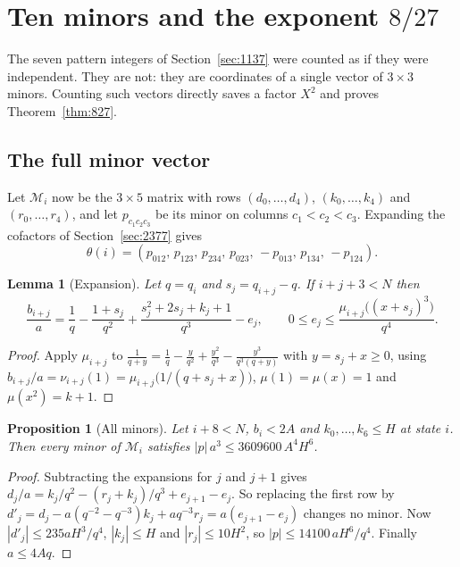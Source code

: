 \documentclass[11pt]{amsart}
\newtheorem{lemma}[theorem]{Lemma}
\newtheorem{proposition}[theorem]{Proposition}
\theoremstyle{definition}
\theoremstyle{remark}
\begin{document}
\section{Ten minors and the exponent \texorpdfstring{$8/27$}{8/27}}\label{sec:827}

The seven pattern integers of Section~\ref{sec:1137} were counted as if they were independent.
They are not: they are coordinates of a single vector of $3\times3$ minors. Counting such vectors
directly saves a factor $X^2$ and proves Theorem~\ref{thm:827}.

\subsection{The full minor vector}
Let $\mathcal M_i$ now be the $3\times5$ matrix with rows $(d_0,\dots,d_4)$, $(k_0,\dots,k_4)$
and $(r_0,\dots,r_4)$, and let $p_{c_1c_2c_3}$ be its minor on columns $c_1<c_2<c_3$. Expanding
the cofactors of Section~\ref{sec:2377} gives
\[
\theta(i)=(p_{012},\,p_{123},\,p_{234},\,p_{023},\,-p_{013},\,p_{134},\,-p_{124}).
\]

\begin{lemma}[Expansion]\label{lem:expand}
Let $q=q_i$ and $s_j=q_{i+j}-q$. If $i+j+3<N$ then
\[
\frac{b_{i+j}}a=\frac1q-\frac{1+s_j}{q^2}+\frac{s_j^2+2s_j+k_j+1}{q^3}-e_j,\qquad
0\le e_j\le\frac{\mu_{i+j}\bigl((x+s_j)^3\bigr)}{q^4}.
\]
\end{lemma}

\begin{proof}
Apply $\mu_{i+j}$ to $\frac1{q+y}=\frac1q-\frac y{q^2}+\frac{y^2}{q^3}-\frac{y^3}{q^3(q+y)}$ with
$y=s_j+x\ge0$, using $b_{i+j}/a=\nu_{i+j}(1)=\mu_{i+j}\bigl(1/(q+s_j+x)\bigr)$, $\mu(1)=\mu(x)=1$
and $\mu(x^2)=k+1$.
\end{proof}

\begin{proposition}[All minors]\label{prop:allminors}
Let $i+8<N$, $b_i<2A$ and $k_0,\dots,k_6\le H$ at state $i$. Then every minor of $\mathcal M_i$
satisfies $|p|\,a^3\le3609600\,A^4H^6$.
\end{proposition}

\begin{proof}
Subtracting the expansions for $j$ and $j+1$ gives
$d_j/a=k_j/q^2-(r_j+k_j)/q^3+e_{j+1}-e_j$. So replacing the first row by
$d'_j=d_j-a(q^{-2}-q^{-3})k_j+aq^{-3}r_j=a(e_{j+1}-e_j)$ changes no minor. Now
$|d'_j|\le235aH^3/q^4$, $|k_j|\le H$ and $|r_j|\le10H^2$, so $|p|\le14100\,aH^6/q^4$. Finally
$a\le4Aq$.
\end{proof}
\end{document}
